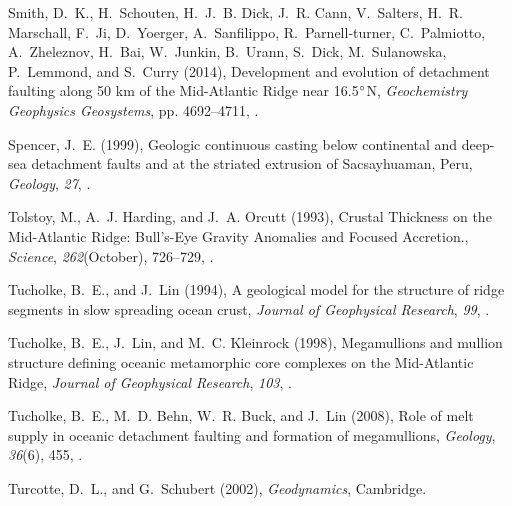 \documentclass[draft,gc]{agutex}
\begin{document}
\begin{article}
\begin{thebibliography}{39}
Smith, D.~K., H.~Schouten, H.~J.~B. Dick, J.~R. Cann, V.~Salters, H.~R.
  Marschall, F.~Ji, D.~Yoerger, A.~Sanfilippo, R.~Parnell-turner, C.~Palmiotto,
  A.~Zheleznov, H.~Bai, W.~Junkin, B.~Urann, S.~Dick, M.~Sulanowska,
  P.~Lemmond, and S.~Curry (2014), {Development and evolution of detachment
  faulting along 50 km of the Mid-Atlantic Ridge near 16.5$\degree$N},
  \textit{Geochemistry Geophysics Geosystems}, pp. 4692--4711,
  .

Spencer, J.~E. (1999), {Geologic continuous casting below continental and
  deep-sea detachment faults and at the striated extrusion of Sacsayhuaman,
  Peru}, \textit{Geology}, \textit{27},
  .

Tolstoy, M., A.~J. Harding, and J.~A. Orcutt (1993), {Crustal Thickness on the
  Mid-Atlantic Ridge: Bull's-Eye Gravity Anomalies and Focused Accretion.},
  \textit{Science}, \textit{262}(October), 726--729,
  .

Tucholke, B.~E., and J.~Lin (1994), {A geological model for the structure of
  ridge segments in slow spreading ocean crust}, \textit{Journal of Geophysical
  Research}, \textit{99}, .

Tucholke, B.~E., J.~Lin, and M.~C. Kleinrock (1998), {Megamullions and mullion
  structure defining oceanic metamorphic core complexes on the Mid-Atlantic
  Ridge}, \textit{Journal of Geophysical Research}, \textit{103},
  .

Tucholke, B.~E., M.~D. Behn, W.~R. Buck, and J.~Lin (2008), {Role of melt
  supply in oceanic detachment faulting and formation of megamullions},
  \textit{Geology}, \textit{36}(6), 455, .

Turcotte, D.~L., and G.~Schubert (2002), \textit{Geodynamics}, Cambridge.


\end{thebibliography}
\end{article}
\end{document}
